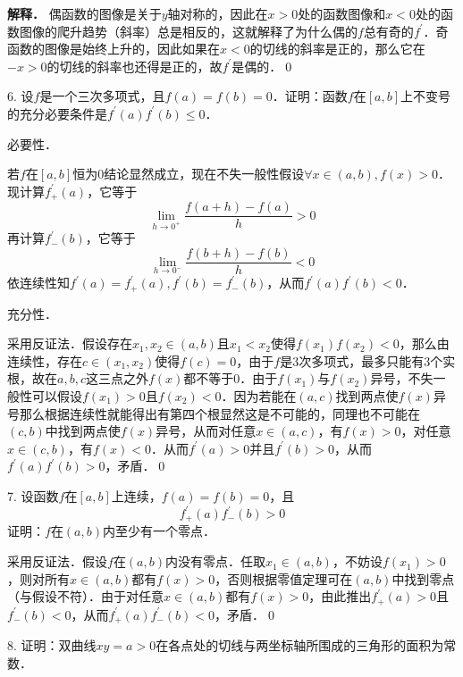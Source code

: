 \textbf{解释．} 偶函数的图像是关于$y$轴对称的，因此在$x > 0$处的函数图像和$x<0$处的函数图像的爬升趋势（斜率）总是相反的，这就解释了为什么偶的$f$总有奇的$f^{\prime}$．奇函数的图像是始终上升的，因此如果在$x < 0$的切线的斜率是正的，那么它在$-x > 0$的切线的斜率也还得是正的，故$f^{\prime}$是偶的．\qed\bigskip

6. 设$f$是一个三次多项式，且$f(a)=f(b)=0$．证明：函数$f$在$[a,b]$上不变号的充分必要条件是$f^{\prime}(a)f^{\prime}(b)\leq 0$．

\prove 

必要性．

若$f$在$[a,b]$恒为$0$结论显然成立，现在不失一般性假设$\forall x \in (a,b), f(x) > 0$．现计算$f^{\prime}_{+}(a)$，它等于
\begin{equation}
    \lim_{h \to 0^+} \frac{f(a+h)-f(a)}{h} > 0
\end{equation}
再计算$f^{\prime}_{-}(b)$，它等于
\begin{equation}
    \lim_{h \to 0^-} \frac{f(b+h)-f(b)}{h} < 0
\end{equation}
依连续性知$f^{\prime}(a)=f^{\prime}_{+}(a), f^{\prime}(b)=f^{\prime}_{-}(b)$，从而$f^{\prime}(a)f^{\prime}(b) < 0$．

充分性．

采用反证法．假设存在$x_1, x_2 \in (a,b)$且$x_1 < x_2$使得$f(x_1)f(x_2)<0$，那么由连续性，存在$c \in (x_1,x_2)$使得$f(c)=0$，由于$f$是$3$次多项式，最多只能有$3$个实根，故在$a,b,c$这三点之外$f(x)$都不等于$0$．由于$f(x_1)$与$f(x_2)$异号，不失一般性可以假设$f(x_1) > 0$且$f(x_2)<0$．因为若能在$(a,c)$找到两点使$f(x)$异号那么根据连续性就能得出有第四个根显然这是不可能的，同理也不可能在$(c,b)$中找到两点使$f(x)$异号，从而对任意$x \in (a,c)$，有$f(x) > 0$，对任意$ x \in (c, b)$，有$f(x) < 0$．从而$f^{\prime}(a) > 0$并且$f^{\prime}(b)>0$，从而$f^{\prime}(a)f^{\prime}(b)>0$，矛盾．\qed\bigskip

7. 设函数$f$在$[a,b]$上连续，$f(a)=f(b)=0$，且
\begin{equation*}
    f^{\prime}_{+}(a)f^{\prime}_{-}(b)>0
\end{equation*}
证明：$f$在$(a,b)$内至少有一个零点．

\prove 采用反证法．假设$f$在$(a,b)$内没有零点．任取$x_1 \in (a,b)$，不妨设$f(x_1)>0$，则对所有$x \in (a,b)$都有$f(x)>0$，否则根据零值定理可在$(a,b)$中找到零点（与假设不符）．由于对任意$x \in (a,b)$都有$f(x)>0$，由此推出$f^{\prime}_{+}(a)>0$且$f^{\prime}_{-}(b)<0$，从而$f^{\prime}_{+}(a)f^{\prime}_{-}(b)<0$，矛盾．\qed\bigskip

8. 证明：双曲线$xy=a>0$在各点处的切线与两坐标轴所围成的三角形的面积为常数．

